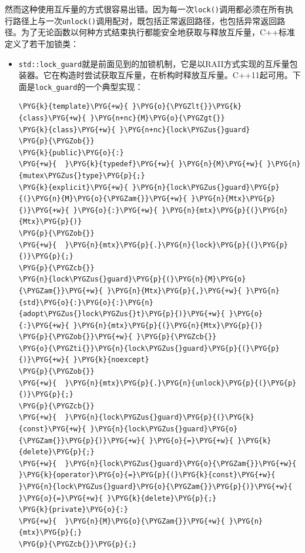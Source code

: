 
然而这种使用互斥量的方式很容易出错。因为每一次\texttt{lock()}调用都必须在所有执行路径上与一次\texttt{unlock()}调用配对，既包括正常返回路径，也包括异常返回路径。为了无论函数以何种方式结束执行都能安全地获取与释放互斥量，C++标准定义了若干加锁类：



\begin{itemize}
\item \texttt{std::\allowbreak{}lock\_\allowbreak{}guard}就是前面见到的加锁机制，它是以RAII方式实现的互斥量包装器。它在构造时尝试获取互斥量，在析构时释放互斥量。C++11起可用。下面是\texttt{lock\_\allowbreak{}guard}的一个典型实现：



\begin{codeblockbg}
\begin{Verbatim}[commandchars=\\\{\},breaklines=true,breakanywhere=true,fontsize=\codefont,xleftmargin=17bp]
\PYG{k}{template}\PYG{+w}{ }\PYG{o}{\PYGZlt{}}\PYG{k}{class}\PYG{+w}{ }\PYG{n+nc}{M}\PYG{o}{\PYGZgt{}}
\PYG{k}{class}\PYG{+w}{ }\PYG{n+nc}{lock\PYGZus{}guard}
\PYG{p}{\PYGZob{}}
\PYG{k}{public}\PYG{o}{:}
\PYG{+w}{  }\PYG{k}{typedef}\PYG{+w}{ }\PYG{n}{M}\PYG{+w}{ }\PYG{n}{mutex\PYGZus{}type}\PYG{p}{;}
\PYG{k}{explicit}\PYG{+w}{ }\PYG{n}{lock\PYGZus{}guard}\PYG{p}{(}\PYG{n}{M}\PYG{o}{\PYGZam{}}\PYG{+w}{ }\PYG{n}{Mtx}\PYG{p}{)}\PYG{+w}{ }\PYG{o}{:}\PYG{+w}{ }\PYG{n}{mtx}\PYG{p}{(}\PYG{n}{Mtx}\PYG{p}{)}
\PYG{p}{\PYGZob{}}
\PYG{+w}{  }\PYG{n}{mtx}\PYG{p}{.}\PYG{n}{lock}\PYG{p}{(}\PYG{p}{)}\PYG{p}{;}
\PYG{p}{\PYGZcb{}}
\PYG{n}{lock\PYGZus{}guard}\PYG{p}{(}\PYG{n}{M}\PYG{o}{\PYGZam{}}\PYG{+w}{ }\PYG{n}{Mtx}\PYG{p}{,}\PYG{+w}{ }\PYG{n}{std}\PYG{o}{:}\PYG{o}{:}\PYG{n}{adopt\PYGZus{}lock\PYGZus{}t}\PYG{p}{)}\PYG{+w}{ }\PYG{o}{:}\PYG{+w}{ }\PYG{n}{mtx}\PYG{p}{(}\PYG{n}{Mtx}\PYG{p}{)}
\PYG{p}{\PYGZob{}}\PYG{+w}{ }\PYG{p}{\PYGZcb{}}
\PYG{o}{\PYGZti{}}\PYG{n}{lock\PYGZus{}guard}\PYG{p}{(}\PYG{p}{)}\PYG{+w}{ }\PYG{k}{noexcept}
\PYG{p}{\PYGZob{}}
\PYG{+w}{  }\PYG{n}{mtx}\PYG{p}{.}\PYG{n}{unlock}\PYG{p}{(}\PYG{p}{)}\PYG{p}{;}
\PYG{p}{\PYGZcb{}}
\PYG{+w}{  }\PYG{n}{lock\PYGZus{}guard}\PYG{p}{(}\PYG{k}{const}\PYG{+w}{ }\PYG{n}{lock\PYGZus{}guard}\PYG{o}{\PYGZam{}}\PYG{p}{)}\PYG{+w}{ }\PYG{o}{=}\PYG{+w}{ }\PYG{k}{delete}\PYG{p}{;}
\PYG{+w}{  }\PYG{n}{lock\PYGZus{}guard}\PYG{o}{\PYGZam{}}\PYG{+w}{ }\PYG{k}{operator}\PYG{o}{=}\PYG{p}{(}\PYG{k}{const}\PYG{+w}{ }\PYG{n}{lock\PYGZus{}guard}\PYG{o}{\PYGZam{}}\PYG{p}{)}\PYG{+w}{ }\PYG{o}{=}\PYG{+w}{ }\PYG{k}{delete}\PYG{p}{;}
\PYG{k}{private}\PYG{o}{:}
\PYG{+w}{  }\PYG{n}{M}\PYG{o}{\PYGZam{}}\PYG{+w}{ }\PYG{n}{mtx}\PYG{p}{;}
\PYG{p}{\PYGZcb{}}\PYG{p}{;}
\end{Verbatim}
\end{codeblockbg}



\end{itemize}
